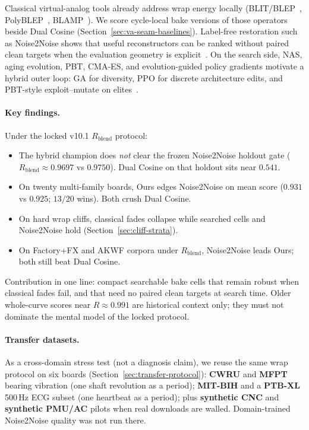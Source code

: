 Classical virtual-analog tools already address wrap energy locally
(BLIT/BLEP~\cite{stilson1996}, PolyBLEP~\cite{nam2009polyblep}, BLAMP~\cite{esqueda2016blamp}).
We score cycle-local bake versions of those operators beside Dual Cosine (Section~\ref{sec:va-seam-baselines}).
Label-free restoration such as Noise2Noise shows that useful reconstructors can be ranked without paired clean targets when the evaluation geometry is explicit~\cite{lehtinen2018,kashyap2021n2n}.
On the search side, NAS, aging evolution, PBT, CMA-ES, and evolution-guided policy gradients motivate a hybrid outer loop: GA for diversity, PPO for discrete architecture edits, and PBT-style exploit--mutate on elites~\cite{elsken2019,real2019,jaderberg2017,schulman2017,khadka2018}.

\paragraph{Key findings.}
Under the locked v10.1 $R_{\mathrm{blend}}$ protocol:
\begin{itemize}
  \item The hybrid champion does \emph{not} clear the frozen Noise2Noise holdout gate
    ($R_{\mathrm{blend}}{\approx}0.9697$ vs $0.9750$). Dual Cosine on that holdout sits near $0.541$.
  \item On twenty multi-family boards, Ours edges Noise2Noise on mean score ($0.931$ vs $0.925$; $13/20$ wins). Both crush Dual Cosine.
  \item On hard wrap cliffs, classical fades collapse while searched cells and Noise2Noise hold (Section~\ref{sec:cliff-strata}).
  \item On Factory+FX and AKWF corpora under $R_{\mathrm{blend}}$, Noise2Noise leads Ours; both still beat Dual Cosine.
\end{itemize}
Contribution in one line: compact searchable bake cells that remain robust when classical fades fail, and that need no paired clean targets at search time.
Older whole-curve scores near $R{\approx}0.991$ are historical context only; they must not dominate the mental model of the locked protocol.

\paragraph{Transfer datasets.}
As a cross-domain stress test (not a diagnosis claim), we reuse the same wrap protocol on six boards
(Section~\ref{sec:transfer-protocol}):
\textbf{CWRU} and \textbf{MFPT} bearing vibration (one shaft revolution as a period);
\textbf{MIT-BIH} and a \textbf{PTB-XL} 500\,Hz ECG subset (one heartbeat as a period);
plus \textbf{synthetic CNC} and \textbf{synthetic PMU/AC} pilots when real downloads are walled.
Domain-trained Noise2Noise quality was not run there.

